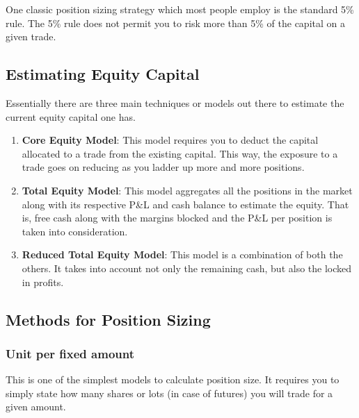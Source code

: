 One classic position sizing strategy which most people employ is the standard 5\% rule. The 5\% rule does not permit you to risk more than 5\% of the capital on a given trade.

\subsection{Estimating Equity Capital}

Essentially there are three main techniques or models out there to estimate the current equity capital one has.
\begin{enumerate}
  \item \textbf{Core Equity Model}: This model requires you to deduct the capital allocated to a trade from the existing capital. This way, the exposure to a trade goes on reducing as you ladder up more and more positions.
  \item \textbf{Total Equity Model}: This model aggregates all the positions in the market along with its respective P\&L and cash balance to estimate the equity. That is, free cash along with the margins blocked and the P\&L per position is taken into consideration.
  \item \textbf{Reduced Total Equity Model}: This model is a combination of both the others. It takes into account not only the remaining cash, but also the locked in profits.
\end{enumerate}


\subsection{Methods for Position Sizing}

\subsubsection{Unit per fixed amount}
This is one of the simplest models to calculate position size. It requires you to simply state how many shares or lots (in case of futures) you will trade for a given amount.

